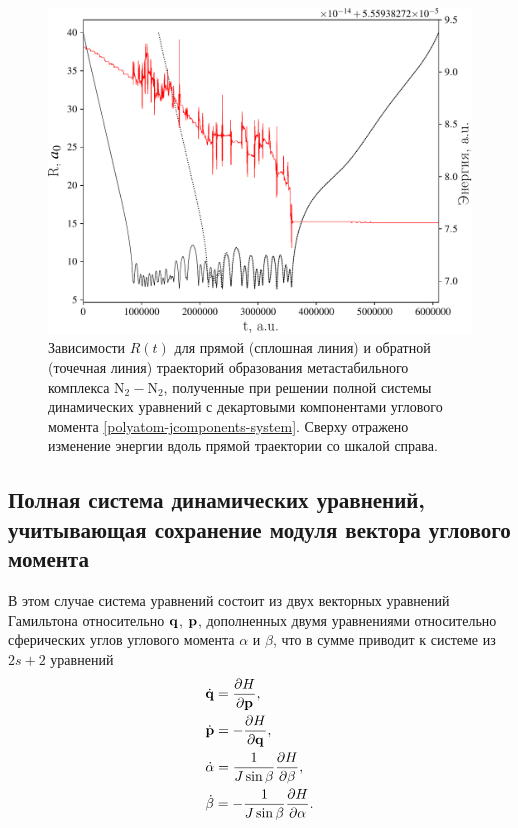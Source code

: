 \begin{figure}[H]
    \centering
    \includegraphics[width=0.75\linewidth]{./pictures/trajectories/jcomponents-trajectory-crop.pdf}
    \caption{Зависимости $R(t)$ для прямой (сплошная линия) и обратной (точечная линия) траекторий образования метастабильного комплекса N$_2-$N$_2$, полученные при решении полной системы динамических уравнений с декартовыми компонентами углового момента \eqref{polyatom-jcomponents-system}. Сверху отражено изменение энергии вдоль прямой траектории со шкалой справа.}
    \label{fig:jcomponents-trajectory}
\end{figure}


\subsection{Полная система динамических уравнений, учитывающая сохранение модуля вектора углового момента}
В этом случае система уравнений состоит из двух векторных уравнений Гамильтона относительно $\mathbf{q}$, $\mathbf{p}$, дополненных двумя уравнениями относительно сферических углов углового момента $\alpha$ и $\beta$, что в сумме приводит к системе из $2s + 2$ уравнений
\begin{gather}
    \begin{aligned}
        &\dot{\mathbf{q}} = \frac{\partial H}{\partial \mathbf{p}}, \\
        &\dot{\mathbf{p}} = -\frac{\partial H}{\partial \mathbf{q}}, \\
        &\dot{\alpha} = \frac{1}{J \sin \beta} \frac{\partial H}{\partial \beta}, \\
        &\dot{\beta} = -\frac{1}{J \sin \beta} \frac{\partial H}{\partial \alpha}.
    \end{aligned}
\end{gather}

